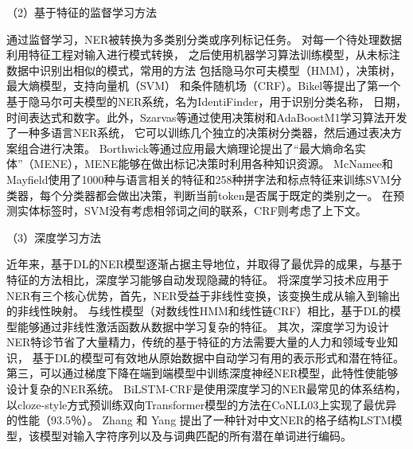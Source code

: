 


（2）基于特征的监督学习方法

通过监督学习，NER被转换为多类别分类或序列标记任务。
对每一个待处理数据利用特征工程对输入进行模式转换，
之后使用机器学习算法训练模型，从未标注数据中识别出相似的模式，常用的方法
包括隐马尔可夫模型（HMM），决策树，最大熵模型，支持向量机（SVM）
和条件随机场（CRF）。Bikel等提出了第一个基于隐马尔可夫模型的NER系统，名为IdentiFinder，用于识别分类名称，
日期，时间表达式和数字\cite{bikel1998nymble,bikel1999algorithm}。此外，Szarvas等通过使用决策树和AdaBoostM1学习算法开发了一种多语言NER系统，
它可以训练几个独立的决策树分类器，然后通过表决方案组合进行决策\cite{szarvas2006multilingual}。 
Borthwick等通过应用最大熵理论提出了“最大熵命名实体”（MENE），MENE能够在做出标记决策时利用各种知识资源\cite{krishnan2006effective}。
 McNamee和Mayfield使用了1000种与语言相关的特征和258种拼字法和标点特征来训练SVM分类器，每个分类器都会做出决策，判断当前token是否属于既定的类别之一\cite{mcnamee2002entity}。
 在预测实体标签时，SVM没有考虑相邻词之间的联系，CRF则考虑了上下文\cite{mccallum2003early}。 

 （3）深度学习方法

 近年来，基于DL的NER模型逐渐占据主导地位，并取得了最优异的成果，与基于特征的方法相比，深度学习能够自动发现隐藏的特征。 
 将深度学习技术应用于NER有三个核心优势，首先，NER受益于非线性变换，该变换生成从输入到输出的非线性映射。
 与线性模型（对数线性HMM和线性链CRF）相比，基于DL的模型能够通过非线性激活函数从数据中学习复杂的特征。
 其次，深度学习为设计NER特诊节省了大量精力，传统的基于特征的方法需要大量的人力和领域专业知识，
 基于DL的模型可有效地从原始数据中自动学习有用的表示形式和潜在特征。
 第三，可以通过梯度下降在端到端模型中训练深度神经NER模型，此特性使能够设计复杂的NER系统。
 BiLSTM-CRF是使用深度学习的NER最常见的体系结构，
 以cloze-style方式预训练双向Transformer模型的方法在CoNLL03上实现了最优异的性能（93.5％）\cite{baevski2019cloze}。 
 Zhang 和 Yang 提出了一种针对中文NER的格子结构LSTM模型，该模型对输入字符序列以及与词典匹配的所有潜在单词进行编码\cite{zhang2018chinese}。

